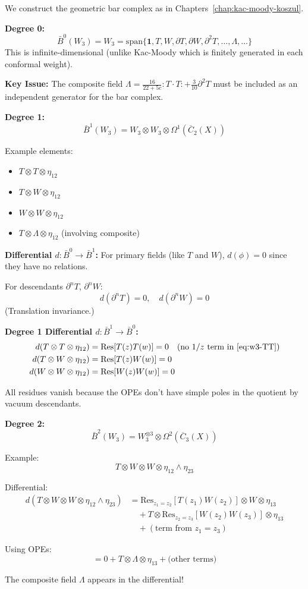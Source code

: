 \begin{construction}
\label{const:w3-bar}
We construct the geometric bar complex as in Chapters~\ref{chap:kac-moody-koszul}.

\textbf{Degree 0:}
$$\bar{B}^0(W_3) = W_3 = \text{span}\{\mathbf{1}, T, W, \partial T, \partial W, \partial^2 T, \ldots, \Lambda, \ldots\}$$
This is infinite-dimensional (unlike Kac-Moody which is finitely generated in each conformal weight).

\textbf{Key Issue:} The composite field $\Lambda = \frac{16}{22+5c} : T \cdot T : + \frac{3}{10}\partial^2 T$ must be included as an independent generator for the bar complex.

\textbf{Degree 1:}
$$\bar{B}^1(W_3) = W_3 \otimes W_3 \otimes \Omega^1(\overline{C}_2(X))$$

Example elements:
\begin{itemize}
\item $T \otimes T \otimes \eta_{12}$
\item $T \otimes W \otimes \eta_{12}$
\item $W \otimes W \otimes \eta_{12}$
\item $T \otimes \Lambda \otimes \eta_{12}$ (involving composite)
\end{itemize}

\textbf{Differential $d: \bar{B}^0 \to \bar{B}^1$:}
For primary fields (like $T$ and $W$), $d(\phi) = 0$ since they have no relations.

For descendants $\partial^n T$, $\partial^n W$:
$$d(\partial^n T) = 0, \quad d(\partial^n W) = 0$$
(Translation invariance.)

\textbf{Degree 1 Differential $d: \bar{B}^1 \to \bar{B}^0$:}
\begin{align*}
d(T \otimes T \otimes \eta_{12}) &= \text{Res}[T(z)T(w)] = 0 \quad \text{(no $1/z$ term in \eqref{eq:w3-TT})} \\
d(T \otimes W \otimes \eta_{12}) &= \text{Res}[T(z)W(w)] = 0 \\
d(W \otimes W \otimes \eta_{12}) &= \text{Res}[W(z)W(w)] = 0
\end{align*}

All residues vanish because the OPEs don't have simple poles in the quotient by vacuum descendants.

\textbf{Degree 2:}
$$\bar{B}^2(W_3) = W_3^{\otimes 3} \otimes \Omega^2(\overline{C}_3(X))$$

Example:
$$T \otimes W \otimes W \otimes \eta_{12} \wedge \eta_{23}$$

Differential:
\begin{align*}
d(T \otimes W \otimes W \otimes \eta_{12} \wedge \eta_{23}) &= \text{Res}_{z_1=z_2}[T(z_1)W(z_2)] \otimes W \otimes \eta_{13} \\
&\quad + T \otimes \text{Res}_{z_2=z_3}[W(z_2)W(z_3)] \otimes \eta_{13} \\
&\quad + (\text{term from } z_1=z_3)
\end{align*}

Using OPEs:
$$= 0 + T \otimes \Lambda \otimes \eta_{13} + \text{(other terms)}$$

The composite field $\Lambda$ appears in the differential!
\end{construction}

